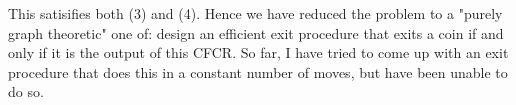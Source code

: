 \documentclass{article}
\begin{document}
This satisifies both (3) and (4). Hence we have reduced the problem to a "purely graph theoretic" one of: design an efficient exit procedure that exits a coin if and only if it is the output of this CFCR. So far, I have tried to come up with an exit procedure that does this in a constant number of moves, but have been unable to do so.
\end{document}

